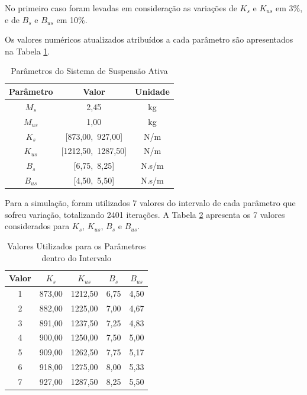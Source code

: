 \documentclass[journal,brazil,english]{IEEEtran}
\begin{document}
No primeiro caso foram levadas em consideração as variações de $K_s$ e $K_{us}$ em 3\%, e de $B_s$ e $B_{us}$ em 10\%.


Os valores numéricos atualizados atribuídos a cada parâmetro são apresentados na Tabela \ref{parametros1}.

\begin{table}[H]{\centering}
\centering
	\caption{Parâmetros do Sistema de Suspensão Ativa}
	\begin{tabular}{|c|c|c|} \hline
    Parâmetro & Valor & Unidade \\ \hline
    $M_s$ & 2,45 & kg \\ \hline
    $M_{us}$ & 1,00 & kg \\ \hline
    $K_s$ & [873,00,~927,00] & N/m \\ \hline
    $K_{us}$ & [1212,50,~1287,50] & N/m \\ \hline
    $B_s$ & [6,75,~8,25] & N.s/m \\ \hline
    $B_{us}$ & [4,50,~5,50] & N.s/m \\ \hline
   \end{tabular}
	\label{parametros1}
\end{table}

Para a simulação, foram utilizados 7 valores do intervalo de cada parâmetro que sofreu variação, totalizando 2401 iterações. A Tabela \ref{caso1} apresenta os 7 valores considerados para $K_s$, $K_{us}$, $B_s$ e $B_{us}$.

\begin{table}[H]{\centering}
\centering
    \caption{Valores Utilizados para os Parâmetros dentro do Intervalo}
    \begin{tabular}{|c|c|c|c|c|} \hline
        Valor & $K_s$ & $K_{us}$ & $B_s$ & $B_{us}$ \\ \hline
        1 & 873,00 & 1212,50 & 6,75 & 4,50 \\ \hline
        2 & 882,00 & 1225,00 & 7,00 & 4,67 \\ \hline
        3 & 891,00 & 1237,50 & 7,25 & 4,83 \\ \hline
        4 & 900,00 & 1250,00 & 7,50 & 5,00 \\ \hline
        5 & 909,00 & 1262,50 & 7,75 & 5,17 \\ \hline
        6 & 918,00 & 1275,00 & 8,00 & 5,33 \\ \hline
        7 & 927,00 & 1287,50 & 8,25 & 5,50 \\ \hline
    \end{tabular}
    \label{caso1}
\end{table}
\end{document}
